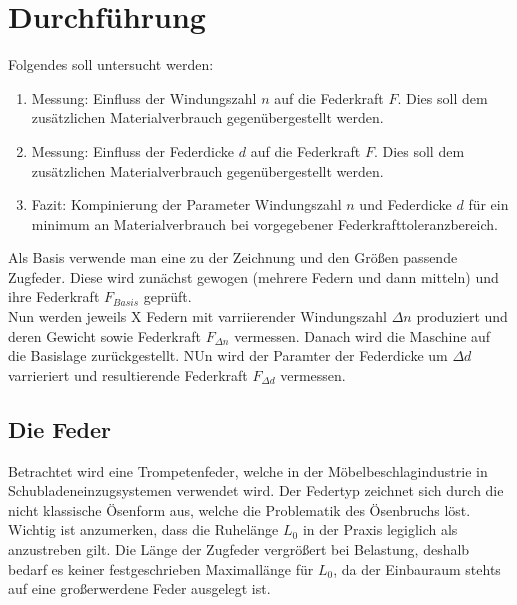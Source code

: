 \newpage
\section{Durchführung}
Folgendes soll untersucht werden:
\begin{enumerate}
    \item Messung: Einfluss der Windungszahl $n$ auf die Federkraft $F$. Dies soll dem zusätzlichen
    Materialverbrauch gegenübergestellt werden.
    \item Messung: Einfluss der Federdicke $d$ auf die Federkraft $F$. Dies soll dem zusätzlichen
    Materialverbrauch gegenübergestellt werden.
    \item Fazit: Kompinierung der Parameter Windungszahl $n$ und Federdicke $d$ für ein minimum
    an Materialverbrauch bei vorgegebener Federkrafttoleranzbereich.
\end{enumerate}
Als Basis verwende man eine zu der Zeichnung und den Größen passende Zugfeder. Diese
wird zunächst gewogen (mehrere Federn und dann mitteln) und ihre Federkraft $F_{Basis}$
geprüft.\\
Nun werden jeweils X Federn mit varriierender Windungszahl $\Delta n$ produziert und deren
Gewicht sowie Federkraft $F_{\Delta n}$ vermessen.
Danach wird die Maschine auf die Basislage zurückgestellt. NUn wird der Paramter 
der Federdicke um $\Delta d$ varrieriert und resultierende Federkraft $F_{\Delta d}$
vermessen.  

\newpage

\subsection{Die Feder}

Betrachtet wird eine Trompetenfeder, welche in der Möbelbeschlagindustrie in Schubladeneinzugsystemen
verwendet wird. 
Der Federtyp zeichnet sich durch die nicht klassische Ösenform aus, welche die Problematik des Ösenbruchs löst.\\

Wichtig ist anzumerken, dass die Ruhelänge $L_0$ in der Praxis legiglich als anzustreben gilt.
Die Länge der Zugfeder vergrößert bei Belastung, deshalb bedarf es keiner festgeschrieben Maximallänge für $L_0$, da
der Einbauraum stehts auf eine großerwerdene Feder ausgelegt ist.  
\newline

